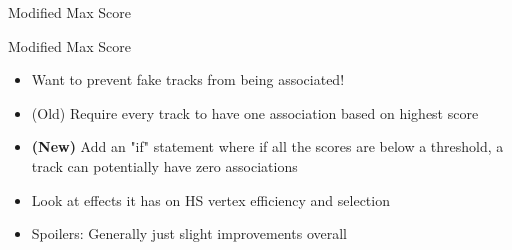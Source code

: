 \documentclass[xcolor=table,aspectratio=169]{beamer}
\begin{document}
\begin{frame}[plain]
    \centering
    Modified Max Score
\end{frame}

\begin{frame}{Modified Max Score}
    \begin{itemize}
        \item Want to prevent fake tracks from being associated!
        \item (Old) Require every track to have one association based on highest score
        \item \textbf{(New)} Add an "if" statement where if all the scores are below a threshold, a track can potentially have zero associations
        \item Look at effects it has on HS vertex efficiency and selection
        \item Spoilers: Generally just slight improvements overall
    \end{itemize}
\end{frame}
\end{document}
